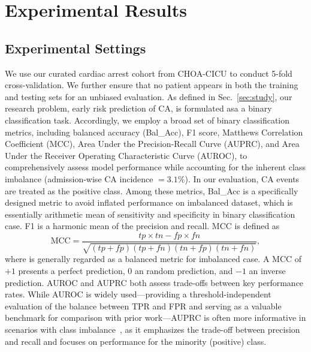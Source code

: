 \section{Experimental Results}

\subsection{Experimental Settings}
We use our curated cardiac arrest cohort from CHOA-CICU to conduct 5-fold cross-validation. We further ensure that no patient appears in both the training and testing sets for an unbiased evaluation.
As defined in Sec.~\ref{sec:study}, our research problem, early risk prediction of CA, is formulated asa a binary classification task. Accordingly, we employ a broad set of binary classification metrics, including balanced accuracy (Bal\_Acc), F1 score, Matthews Correlation Coefficient (MCC), Area Under the Precision-Recall Curve (AUPRC), and Area Under the Receiver Operating Characteristic Curve (AUROC), to comprehensively assess model performance while accounting for the inherent class imbalance (admission-wise CA incidence $=3.1\%$). 
In our evaluation, CA events are treated as the positive class. 
Among these metrics, Bal\_Acc is a specifically designed metric to avoid inflated performance on imbalanced dataset, which is essentially arithmetic mean of sensitivity and specificity in binary classification case. F1 is a harmonic mean of the precision and recall. 
MCC is defined as
\begin{equation}
    \text{MCC}=\frac{tp\times tn - fp \times fn}{\sqrt{(tp+fp)(tp+fn)(tn+fp)(tn+fn)}},
\end{equation}
where is generally regarded as a balanced metric for imbalanced case. A MCC of $+1$ presents a perfect prediction, $0$ an random prediction, and $-1$ an inverse prediction. AUROC and AUPRC both assess trade-offs between key performance rates. While AUROC is widely used—providing a threshold-independent evaluation of the balance between TPR and FPR and serving as a valuable benchmark for comparison with prior work—AUPRC is often more informative in scenarios with class imbalance~\cite{tomavsev2021use}, as it emphasizes the trade-off between precision and recall and focuses on performance for the minority (positive) class.

